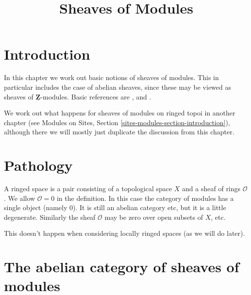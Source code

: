 

%


\title{Sheaves of Modules}


\maketitle

\label{section-phantom}

\tableofcontents

\section{Introduction}
\label{section-introduction}

\noindent
In this chapter we work out basic notions of sheaves of modules.
This in particular includes the case of abelian sheaves, since
these may be viewed as sheaves of $\underline{\mathbf{Z}}$-modules.
Basic references are \cite{FAC}, \cite{EGA} and \cite{SGA4}.

\medskip\noindent
We work out what happens for sheaves of modules on ringed topoi
in another chapter (see
Modules on Sites, Section \ref{sites-modules-section-introduction}),
although there we will mostly just duplicate the discussion
from this chapter.





\section{Pathology}
\label{section-pathology}

\noindent
A ringed space is a pair consisting of a topological space $X$
and a sheaf of rings $\mathcal{O}$. We allow $\mathcal{O} = 0$
in the definition. In this case the category of modules has a
single object (namely $0$). It is still an abelian category etc,
but it is a little degenerate. Similarly the sheaf $\mathcal{O}$
may be zero over open subsets of $X$, etc.

\medskip\noindent
This doesn't happen when considering locally ringed spaces (as we
will do later).








\section{The abelian category of sheaves of modules}
\label{section-kernels}

